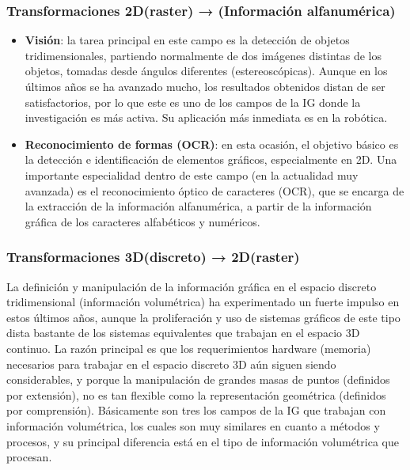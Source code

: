 \subsubsection{Transformaciones 2D(raster) → (Información alfanumérica)}
\begin{itemize}
    \item \textbf{Visión}: la tarea principal en este campo es la detección de objetos tridimensionales, partiendo normalmente de dos imágenes distintas de los objetos, tomadas desde ángulos diferentes (estereoscópicas). Aunque en los últimos años se ha avanzado mucho, los resultados obtenidos distan de ser satisfactorios, por lo que este es uno de los campos de la IG donde la investigación es más activa. Su aplicación más inmediata es en la robótica.
    \item \textbf{Reconocimiento de formas (OCR)}: en esta ocasión, el objetivo básico es la detección e identificación de elementos gráficos, especialmente en 2D. Una importante especialidad dentro de este campo (en la actualidad muy avanzada) es el reconocimiento óptico de caracteres (OCR), que se encarga de la extracción de la información alfanumérica, a partir de la información gráfica de los caracteres alfabéticos y numéricos.
\end{itemize}

\subsubsection{Transformaciones 3D(discreto) → 2D(raster)}
La definición y manipulación de la información gráfica en el espacio discreto tridimensional (información volumétrica) ha experimentado un fuerte impulso en estos últimos años, aunque la proliferación y uso de sistemas gráficos de este tipo dista bastante de los sistemas equivalentes que trabajan en el espacio 3D continuo. La razón principal es que los requerimientos hardware (memoria) necesarios para trabajar en el espacio discreto 3D aún siguen siendo considerables, y porque la manipulación de grandes masas de puntos (definidos por extensión), no es tan flexible como la representación geométrica (definidos por comprensión). Básicamente son tres los campos de la IG que trabajan con información volumétrica, los cuales son muy similares en cuanto a métodos y procesos, y su principal diferencia está en el tipo de información volumétrica que procesan.

